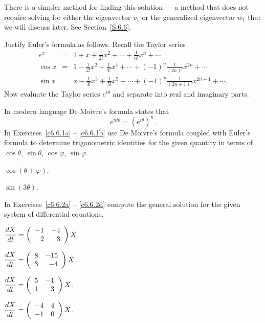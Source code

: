 There is a simpler method for finding this solution --- a method that
does not require solving for either the eigenvector $v_1$ or the generalized
eigenvector $w_1$ that we will discuss later.  See Section~\ref{S:6.6}.

\EXER

\TEXER

\begin{exercise}  \label{c6.6.05}
Justify Euler's formula  as follows.  Recall the
Taylor series
\begin{eqnarray*}
e^x & = & 1 + x + \frac{1}{2!}x^2 + \cdots + \frac{1}{n!}x^n + \cdots\\
\cos x & = & 1 - \frac{1}{2!}x^2 + \frac{1}{4!}x^4 + \cdots +
(-1)^n \frac{1}{(2n)!}x^{2n} + \cdots \\
\sin x & = & x - \frac{1}{3!}x^3 + \frac{1}{5!}x^5 + \cdots +
(-1)^n \frac{1}{(2n+1)!}x^{2n+1} + \cdots.
\end{eqnarray*}
Now evaluate the Taylor series $e^{i\theta}$ and separate into real and
imaginary parts.
\end{exercise}

 In modern language De Moivre's formula states that
\[
e^{ni\theta} = \left(e^{i\theta}\right)^n.
\]
In Exercises~\ref{c6.6.1a} -- \ref{c6.6.1b} use De Moivre's formula coupled
with Euler's formula  to determine trigonometric identities
for the given quantity in terms of $\cos\theta$, $\sin\theta$, $\cos\varphi$,
$\sin\varphi$.
\begin{exercise}  \label{c6.6.1a}
$\cos(\theta+\varphi)$.
\end{exercise}
\begin{exercise}  \label{c6.6.1b}
$\sin(3\theta)$.
\end{exercise}

In Exercises~\ref{c6.6.2a} -- \ref{c6.6.2d} compute the general solution for
the given system of differential equations.
\begin{exercise}  \label{c6.6.2a}
$\displaystyle\frac{dX}{dt} = \left(\begin{array}{rr} -1 & -4\\ 2 &3\end{array}\right) X$.
\end{exercise}
\begin{exercise}  \label{c6.6.2b}
$\displaystyle\frac{dX}{dt} = \left(\begin{array}{rr} 8 & -15\\ 3 &-4\end{array}\right) X$.
\end{exercise}
\begin{exercise}  \label{c6.6.2c}
$\displaystyle\frac{dX}{dt} = \left(\begin{array}{rr} 5 & -1\\ 1 &3\end{array}\right) X$.
\end{exercise}
\begin{exercise}  \label{c6.6.2d}
$\displaystyle\frac{dX}{dt} = \left(\begin{array}{rr} -4 & 4\\ -1 &0\end{array}\right) X$.
\end{exercise}

